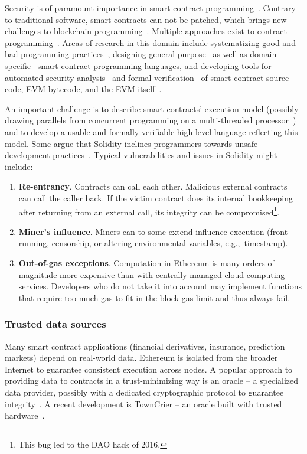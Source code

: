 Security is of paramount importance in smart contract programming~\cite{Atzei2017, Delmolino2016}.
Contrary to traditional software, smart contracts can not be patched, which brings new challenges to blockchain programming~\cite{Porru2017}.
Multiple approaches exist to contract programming~\cite{Seijas2016}.
Areas of research in this domain include systematizing good and bad programming practices~\cite{ConsenSys16, Chen2017}, designing general-purpose~\cite{Hirai2017a, Buterin2017b, Pettersson2016} as well as domain-specific~\cite{Biryukov2017, EgelundMueller2017} smart contract programming languages, and developing tools for automated security analysis~\cite{Luu2016a, Tsankov2018} and formal verification~\cite{Bhargavan2016} of smart contract source code, EVM bytecode, and the EVM itself~\cite{Hirai2017}.

An important challenge is to describe smart contracts' execution model (possibly drawing parallels from concurrent programming on a multi-threaded processor~\cite{Sergey2017}) and to develop a usable and formally verifiable high-level language reflecting this model.
Some argue that Solidity inclines programmers towards unsafe development practices~\cite{ydtm2016}.
Typical vulnerabilities and issues in Solidity might include:
\begin{enumerate}
	\item \textbf{Re-entrancy}. Contracts can call each other. Malicious external contracts can call the caller back. If the victim contract does its internal bookkeeping after returning from an external call, its integrity can be compromised\footnote{This bug led to the DAO hack of 2016.}.
	\item \textbf{Miner's influence}. Miners can to some extend influence execution (front-running, censorship, or altering environmental variables, e.g.,~timestamp).
	\item \textbf{Out-of-gas exceptions}. Computation in Ethereum is many orders of magnitude more expensive than with centrally managed cloud computing services. Developers who do not take it into account may implement functions that require too much gas to fit in the block gas limit and thus always fail.
\end{enumerate}

\subsubsection*{Trusted data sources}
Many smart contract applications (financial derivatives, insurance, prediction markets) depend on real-world data.
Ethereum is isolated from the broader Internet to guarantee consistent execution across nodes.
A popular approach to providing data to contracts in a trust-minimizing way is an oracle -- a specialized data provider, possibly with a dedicated cryptographic protocol to guarantee integrity~\cite{Provable}.
A recent development is TownCrier -- an oracle built with trusted hardware~\cite{Zhang2016}.

